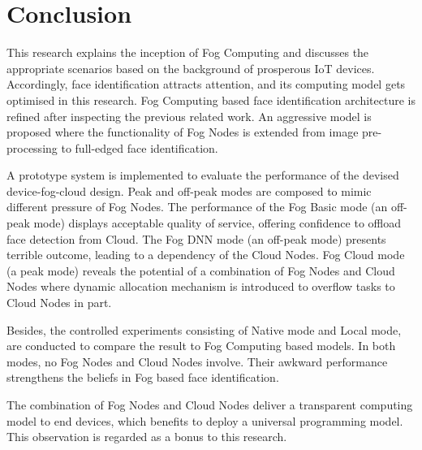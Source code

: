 \chapter{Conclusion} \label{chap:conclusion}

This research explains the inception of Fog Computing and discusses the appropriate scenarios based on the background of prosperous IoT devices. Accordingly, face identification attracts attention, and its computing model gets optimised in this research. Fog Computing based face identification architecture is refined after inspecting the previous related work. An aggressive model is proposed where the functionality of Fog Nodes is extended from image pre-processing to full-edged face identification.

A prototype system is implemented to evaluate the performance of the devised device-fog-cloud design. Peak and off-peak modes are composed to mimic different pressure of Fog Nodes. The performance of the Fog Basic mode (an off-peak mode) displays acceptable quality of service, offering confidence to offload face detection from Cloud. The Fog DNN mode (an off-peak mode) presents terrible outcome, leading to a dependency of the Cloud Nodes. Fog Cloud mode (a peak mode) reveals the potential of a combination of Fog Nodes and Cloud Nodes where dynamic allocation mechanism is introduced to overflow tasks to Cloud Nodes in part.

Besides, the controlled experiments consisting of Native mode and Local mode, are conducted to compare the result to Fog Computing based models. In both modes, no Fog Nodes and Cloud Nodes involve. Their awkward performance strengthens the beliefs in Fog based face identification.

The combination of Fog Nodes and Cloud Nodes deliver a transparent computing model to end devices, which benefits to deploy a universal programming model. This observation is regarded as a bonus to this research.